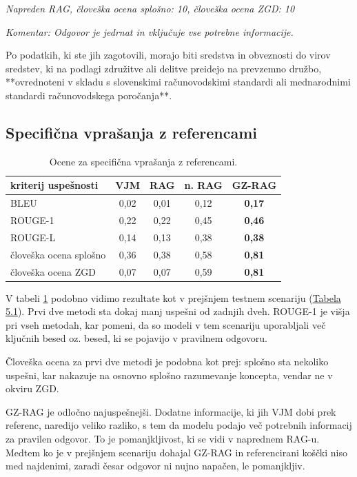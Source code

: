 \documentclass[a4paper,12pt,openright]{book}
\begin{document}
\textit{Napreden RAG, človeška ocena splošno: 10, človeška ocena ZGD: 10}

\textit{Komentar: Odgovor je jedrnat in vključuje vse potrebne informacije.}

\begin{mdframed}[linewidth=1pt]
	\raggedright
	\ttfamily
	Po podatkih, ki ste jih zagotovili, morajo biti sredstva in obveznosti do virov sredstev, ki na podlagi združitve ali delitve preidejo na prevzemno družbo, **ovrednoteni v skladu s slovenskimi računovodskimi standardi ali mednarodnimi standardi računovodskega poročanja**.
\end{mdframed}

\subsection{Specifična vprašanja z referencami}

\begin{table}[H]
	\centering
	\caption{Ocene za specifična vprašanja z referencami.}
	\begin{tabular}{|l|c|c|c|c|}
		\hline
		kriterij uspešnosti    & VJM  & RAG  & n. RAG & GZ-RAG        \\ \hline
		BLEU                   & 0,02 & 0,01 & 0,12   & \textbf{0,17} \\ \hline
		ROUGE-1                & 0,22 & 0,22 & 0,45   & \textbf{0,46} \\ \hline
		ROUGE-L                & 0,14 & 0,13 & 0,38   & \textbf{0,38} \\ \hline
		človeška ocena splošno & 0,36 & 0,38 & 0,58   & \textbf{0,81} \\ \hline
		človeška ocena ZGD     & 0,07 & 0,07 & 0,59   & \textbf{0,81} \\ \hline
	\end{tabular}
	\label{rez2}
\end{table}

V tabeli \ref{rez2} podobno vidimo rezultate kot v prejšnjem testnem scenariju (\hyperref[rez1]{Tabela 5.1}). Prvi dve metodi sta dokaj manj uspešni od zadnjih dveh. ROUGE-1 je višja pri vseh metodah, kar pomeni, da so modeli v tem scenariju uporabljali več ključnih besed oz. besed, ki se pojavijo v pravilnem odgovoru.

Človeška ocena za prvi dve metodi je podobna kot prej: splošno sta nekoliko uspešni, kar nakazuje na osnovno splošno razumevanje koncepta, vendar ne v okviru ZGD.

GZ-RAG je odločno najuspešnejši. Dodatne informacije, ki jih VJM dobi prek referenc, naredijo veliko razliko, s tem da modelu podajo več potrebnih informacij za pravilen odgovor. To je pomanjkljivost, ki se vidi v naprednem RAG-u. Medtem ko je v prejšnjem scenariju dohajal GZ-RAG in referencirani koščki niso med najdenimi, zaradi česar odgovor ni nujno napačen, le pomanjkljiv.
\end{document}
